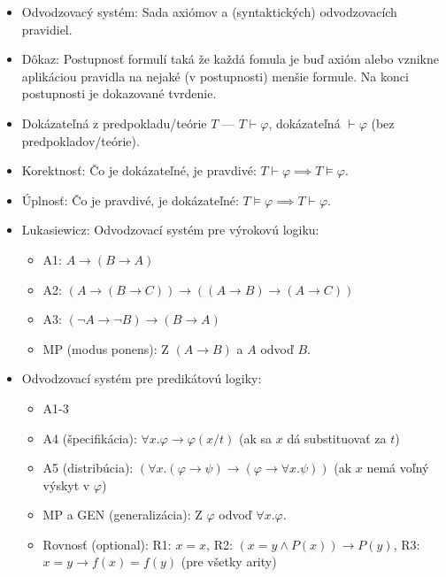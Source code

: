 \documentclass[paper=a4, fontsize=11pt]{scrartcl} %
\numberwithin{equation}{section} %
\numberwithin{figure}{section} %
\numberwithin{table}{section} %
\begin{document}
	\begin{itemize}
		
		\item Odvodzovacý systém: Sada axiómov a (syntaktických) odvodzovacích pravidiel.
		
		\item Dôkaz: Postupnosť formulí taká že každá fomula je buď axióm alebo vznikne aplikáciou pravidla na nejaké (v postupnosti) menšie formule. Na konci postupnosti je dokazované tvrdenie.				
		
		\item Dokázateľná z predpokladu/teórie $T$ — $T \vdash \varphi$, dokázateľná $\vdash \varphi$ (bez predpokladov/teórie).
		
		\item Korektnosť: Čo je dokázateľné, je pravdivé: $T \vdash \varphi \implies T \models \varphi$.
		\item Úplnosť: Čo je pravdivé, je dokázateľné: $T \models \varphi \implies T \vdash \varphi$.
		
		\item Lukasiewicz: Odvodzovací systém pre výrokovú logiku:
		
		\begin{itemize}
			\item A1: $A \to (B \to A)$
			\item A2: $(A \to (B \to C)) \to ((A \to B) \to (A \to C))$
			\item A3: $(\neg A \to \neg B) \to (B \to A)$
			\item MP (modus ponens): Z $(A \to B)$ a $A$ odvoď $B$.
		\end{itemize}
	
		\item Odvodzovací systém pre predikátovú logiky:
		
		\begin{itemize}
			\item A1-3
			\item A4 (špecifikácia): $\forall x. \varphi \to \varphi(x / t)$ (ak sa $x$ dá substituovať za $t$)
			\item A5 (distribúcia): $(\forall x. (\varphi \to \psi) \to (\varphi \to \forall x. \psi))$ (ak $x$ nemá voľný výskyt v $\varphi$)
			\item MP a GEN (generalizácia): Z $\varphi$ odvoď $\forall x. \varphi$.
			\item Rovnosť (optional): R1: $x = x$, R2: $(x=y \land P(x)) \to P(y)$, R3: $x = y \to f(x) = f(y)$ (pre všetky arity)
		\end{itemize}
	

\end{itemize}
\end{document}
